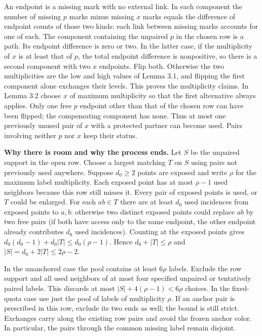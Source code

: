 \documentclass[english,11pt,a4paper]{article}
\newcounter{none}
\begin{document}
An endpoint is a missing mark with no external link. In each component the number of missing \(p\) marks minus missing \(x\) marks equals the difference of endpoint counts of those two kinds: each link between missing marks accounts for one of each. The component containing the unpaired \(p\) in the chosen row is a path. Its endpoint difference is zero or two. In the latter case, if the multiplicity of \(x\) is at least that of \(p\), the total endpoint difference is nonpositive, so there is a second component with two \(x\) endpoints. Flip both. Otherwise the two multiplicities are the low and high values of Lemma 3.1, and flipping the first component alone exchanges their levels. This proves the multiplicity claims. In Lemma 3.2 choose \(x\) of maximum multiplicity so that the first alternative always applies. Only one free \(p\) endpoint other than that of the chosen row can have been flipped; the compensating component has none. Thus at most one previously unused pair of \(x\) with a protected partner can become used. Pairs involving neither \(p\) nor \(x\) keep their status.

\textbf{Why there is room and why the process ends.} Let \(S\) be the unpaired support in the open row. Choose a largest matching \(T\) on \(S\) using pairs not previously used anywhere. Suppose \(d_0\ge2\) points are exposed and write \(\rho\) for the maximum label multiplicity. Each exposed point has at most \(\rho-1\) used neighbors because this row still misses it. Every pair of exposed points is used, or \(T\) could be enlarged. For each \(ab\in T\) there are at least \(d_0\) used incidences from exposed points to \(a,b\): otherwise two distinct exposed points could replace \(ab\) by two free pairs (if both have access only to the same endpoint, the other endpoint already contributes \(d_0\) used incidences). Counting at the exposed points gives \(d_0(d_0-1)+d_0|T|\le d_0(\rho-1)\). Hence \(d_0+|T|\le\rho\) and \(|S|=d_0+2|T|\le2\rho-2\).

In the unanchored case the pool contains at least \(6\rho\) labels. Exclude the row support and all used neighbors of at most four specified unpaired or tentatively paired labels. This discards at most \(|S|+4(\rho-1)<6\rho\) choices. In the fixed-quota case use just the pool of labels of multiplicity \(\rho\). If an anchor pair is prescribed in this row, exclude its two ends as well; the bound is still strict. Exchanges carry along the existing row pairs and avoid the frozen anchor color. In particular, the pairs through the common missing label remain disjoint.
\end{document}
